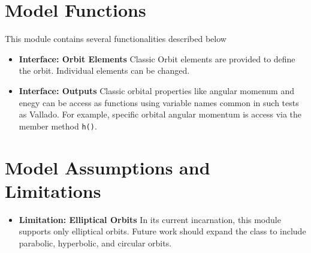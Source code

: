 \section{Model Functions}
This module contains several functionalities described below

\begin{itemize}
	\item \textbf{Interface: Orbit Elements}
	Classic Orbit elements are provided to define the orbit. Individual elements can be changed.
	\item \textbf{Interface: Outputs}
	Classic orbital properties like angular momenum and enegy can be access as functions using variable names common in such tests as Vallado. For example, specific orbital angular momentum is access via the member method \verb|h()|.
	
\end{itemize}

\section{Model Assumptions and Limitations}
\begin{itemize}
	\item \textbf{Limitation: Elliptical Orbits} In its current incarnation, this module supports only elliptical orbits. Future work should expand the class to include parabolic, hyperbolic, and circular orbits.
\end{itemize}